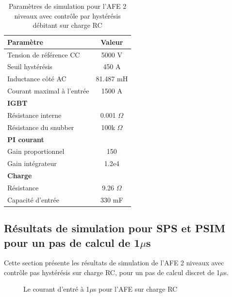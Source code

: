 \begin{table}[htb]
\centering
\begin{tabular}{|l|c|} 
  \hline
  \textbf{Paramètre} & \textbf{Valeur}  \\
  \hline\hline
  Tension de référence CC & 5000 V\\ \hline
  Seuil hystérésis & 450 A\\ \hline
  Inductance côté AC& 81.487 mH\\ \hline
  Courant maximal à l'entrée& 1500 A \\ \hline \hline
  \multicolumn{2}{|l|}{\textbf{IGBT}}\\ \hline
  Résistance interne & 0.001 $\Omega$\\
  Résistance du snubber & 100k $\Omega$\\ \hline \hline
   \multicolumn{2}{|l|}{\textbf{PI courant}}\\ \hline
  Gain proportionnel & 150 \\
  Gain intégrateur & 1.2e4 \\ \hline \hline
  \multicolumn{2}{|l|}{\textbf{Charge}}\\ \hline
  Résistance & 9.26 $\Omega$ \\
  Capacité d'entrée & 330 mF\\
  \hline
\end{tabular}
\caption{Paramètres de simulation pour l'AFE 2 niveaux avec contrôle par hystérésis débitant sur charge RC}
\label{p_AF_RC}
\end{table}

\clearpage

\subsection{Résultats de simulation pour SPS et PSIM pour un pas de calcul de 1$\mu$s}
Cette section présente les résultats de simulation de l'AFE 2 niveaux avec contrôle pas hystérésis sur charge RC, pour un pas de calcul discret de 1$\mu$s. 




\begin{figure}[htb]
\caption{Le courant d'entré à 1$\mu$s pour l'AFE sur charge RC}
\label{AF_RC_cou}
\end{figure}




